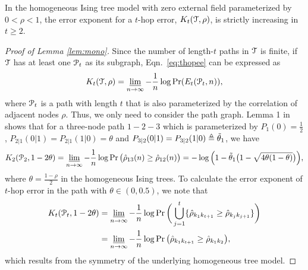 \begin{lemma}\label{lem:mono}
	In the homogeneous Ising tree model with zero external field parameterized by $0<\rho<1$, the error exponent for a $t$-hop error, $K _{t}(\mathcal{T},\rho)$, is strictly increasing in $t\geq 2$.
\end{lemma}
\begin{proof}[Proof of Lemma \ref{lem:mono}]
	Since the number of length-$t$ paths in $\mathcal{T}$ is finite, if $\mathcal{T}$ has at least one $\mathcal{P}_{t}$ as its subgraph, Eqn.~\eqref{eq:thopee} can be expressed as
	\begin{align}
		K _{t}(\mathcal{T},\rho)=\varliminf_{n\rightarrow \infty}-\frac{1}{n}\log\Pr (E_{t}(\mathcal{P}_{t},n)),
	\end{align}
	where $\mathcal{P}_{t}$ is a path with length $t$ that is also parameterized by the correlation of adjacent nodes $\rho$. Thus, we only need to consider the path graph. Lemma 1 in \cite{tandon2020exact} shows that for a three-node path $1-2-3$ which is parameterized by $P_{1}(0)=\frac{1}{2}$, $P_{2|1}(0|1)=P_{2|1}(1|0)=\theta$ 
	and $P_{3|2}(0|1)=P_{3|2}(1|0)\triangleq\tilde{\theta}_{1}$, we have
	\begin{align}
		K_{2}(\mathcal{P}_{2},1-2\theta)=\varliminf_{n\rightarrow \infty}-\frac{1}{n}\log\Pr\big(\hat{\rho}_{13}(n)\geq\hat{\rho}_{12}(n)\big) 
		=-\log\Big(1-\tilde{\theta}_{1}\big(1-\sqrt{4\theta(1-\theta)}\big)\Big),
	\end{align}
	where $\theta=\frac{1-\rho}{2}$ in the homogeneous Ising trees. To calculate the error exponent of $t$-hop error in the path with $\theta\in (0,0.5)$, we note that
	\begin{align}
		K _{t}(\mathcal{P}_{t},1-2\theta)&=\varliminf_{n\rightarrow \infty}-\frac{1}{n}\log\Pr\bigg(\bigcup_{j=1}^{t}\{\hat{\rho}_{k_{1}k_{t+1}}\geq \hat{\rho}_{k_{j}k_{j+1}}\}\bigg)\\*
		&=\varliminf_{n\rightarrow \infty}-\frac{1}{n}\log\Pr\big(\hat{\rho}_{k_{1}k_{t+1}}\geq \hat{\rho}_{k_{1}k_{2}}\big),
	\end{align}
	which results from the symmetry of the underlying homogeneous tree model.


\end{proof}
